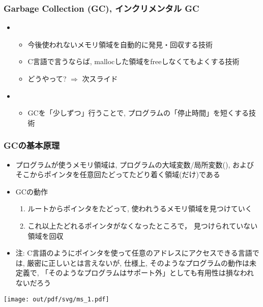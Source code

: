 \documentclass[12pt,dvipdfmx]{beamer}
\begin{document}
\begin{frame}
  \frametitle{Garbage Collection (GC), インクリメンタル GC}

  \begin{itemize}
  \item {}
    \begin{itemize}
    \item 今後使われないメモリ領域を自動的に発見・回収する技術
    \item C言語で言うならば, mallocした領域をfreeしなくてもよくする技術
    \item どうやって? $\Rightarrow$ 次スライド
    \end{itemize}

  \item {}
    \begin{itemize}
    \item GCを「少しずつ」行うことで,
      プログラムの「停止時間」を短くする技術
    \end{itemize}

  \end{itemize}
\end{frame}

\begin{frame}
\frametitle{GCの基本原理}
\begin{itemize}
\item プログラムが使うメモリ領域は, プログラムの大域変数/局所変数(),
  およびそこからポインタを任意回たどってたどり着く領域(だけ)である
\item GCの動作
  \begin{enumerate}
  \item ルートからポインタをたどって, 使われうるメモリ領域を見つけていく
  \item これ以上たどれるポインタがなくなったところで，
    見つけられていない領域を回収
  \end{enumerate}
\item {\scriptsize 注: C言語のようにポインタを使って任意のアドレスにアクセスできる言語では,
    厳密に正しいとは言えないが, 仕様上, そのようなプログラムの動作は未定義で,
    「そのようなプログラムはサポート外」としても有用性は損なわれないだろう}
\end{itemize}

\begin{center}
\texttt{[image: out/pdf/svg/ms\_1.pdf]}
\end{center}

\end{frame}
\end{document}
